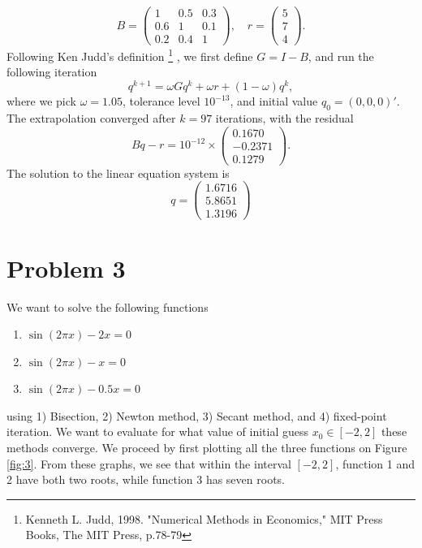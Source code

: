 \documentclass[11pt]{article}
\newcommand{\1}{\mathbbm{1}}
\newcounter{daggerfootnote}
\newcommand*{\daggerfootnote}[1]{%
	\setcounter{daggerfootnote}{\value{footnote}}%
	\renewcommand*{\thefootnote}{\fnsymbol{footnote}}%
	\footnote[2]{#1}%
	\setcounter{footnote}{\value{daggerfootnote}}%
	\renewcommand*{\thefootnote}{\arabic{footnote}}%
}
\begin{document}
\[B = \begin{pmatrix}
 1&0.5&0.3\\0.6&1&0.1\\0.2&0.4&1
\end{pmatrix}, \quad r = \begin{pmatrix}
	5\\7\\4
\end{pmatrix}. \]
Following Ken Judd's definition\daggerfootnote{Kenneth L. Judd, 1998. "Numerical Methods in Economics," MIT Press Books, The MIT Press, p.78-79}, we first define $G=I-B$, and run the following iteration
\[q^{k+1}=\omega G q^k +\omega r + (1-\omega)q^k,\] 
where we pick $\omega=1.05$, tolerance level $10^{-13}$, and initial value $q_0=(0,0,0)'$. The extrapolation converged after $k=97$ iterations, with the residual 
\[Bq-r =  10^{-12} \times
\begin{pmatrix}
0.1670\\
-0.2371\\
0.1279
\end{pmatrix}.\] 
The solution to the linear equation system is
\[
q=\begin{pmatrix}
	1.6716\\
	5.8651\\
	1.3196
\end{pmatrix}
\]
\section*{Problem 3}
We want to solve the following functions 
\begin{enumerate}
	\item $\sin(2\pi x)-2x=0$
	\item $\sin(2\pi x)-x=0$
	\item $\sin(2\pi x)-0.5x=0$
\end{enumerate}
using 1) Bisection, 2) Newton method, 3) Secant method, and 4) fixed-point iteration. We want to evaluate for what value of initial guess $x_0\in[-2,2]$ these methods converge. We proceed by first plotting all the three functions on Figure \ref{fig:3}. From these graphs, we see that within the interval $[-2,2]$, function 1 and 2 have both two roots, while function 3 has seven roots.
\end{document}
